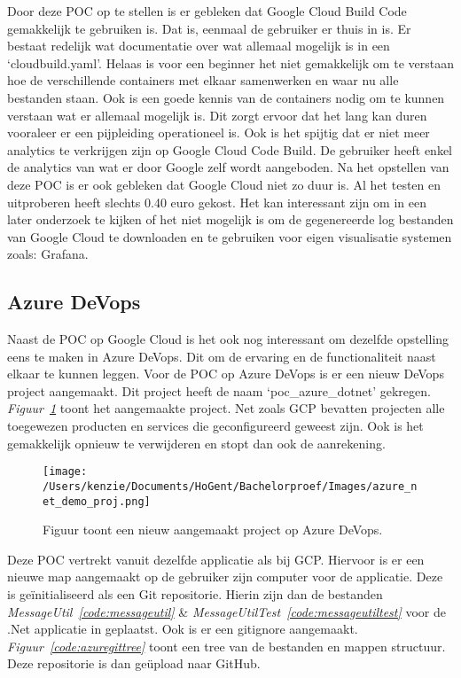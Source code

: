 Door deze POC op te stellen is er gebleken dat Google Cloud Build Code gemakkelijk te gebruiken is. Dat is, eenmaal de gebruiker er thuis in is. Er bestaat redelijk wat documentatie over wat allemaal mogelijk is in een ‘cloudbuild.yaml’. Helaas is voor een beginner het niet gemakkelijk om te verstaan hoe de verschillende containers met elkaar samenwerken en waar nu alle bestanden staan. Ook is een goede kennis van de containers nodig om te kunnen verstaan wat er allemaal mogelijk is. Dit zorgt ervoor dat het lang kan duren vooraleer er een pijpleiding operationeel is. Ook is het spijtig dat er niet meer analytics te verkrijgen zijn op Google Cloud Code Build. De gebruiker heeft enkel de analytics van wat er door Google zelf wordt aangeboden. Na het opstellen van deze POC is er ook gebleken dat Google Cloud niet zo duur is. Al het testen en uitproberen heeft slechts 0.40 euro gekost.
 Het kan interessant zijn om in een later onderzoek te kijken of het niet mogelijk is om de gegenereerde log bestanden van Google Cloud te downloaden en te gebruiken voor eigen visualisatie systemen zoals: Grafana. 

\subsection{Azure DeVops}
\label{sec:VergelijkingADV}
Naast de POC op Google Cloud is het ook nog interessant om dezelfde opstelling eens te maken in Azure DeVops. Dit om de ervaring en de functionaliteit naast elkaar te kunnen leggen. Voor de POC op Azure DeVops is er een nieuw DeVops project aangemaakt. Dit project heeft de naam ‘poc\_azure\_dotnet’ gekregen. \emph{Figuur~\ref{fig:Azure_POC_proj}} toont het aangemaakte project. Net zoals GCP bevatten projecten alle toegewezen producten en services die geconfigureerd geweest zijn. Ook is het gemakkelijk opnieuw te verwijderen en stopt dan ook de aanrekening.

\begin{figure}[!htbp]
    \centering
    \texttt{[image: /Users/kenzie/Documents/HoGent/Bachelorproef/Images/azure\_net\_demo\_proj.png]}
    \caption{Figuur toont een nieuw aangemaakt project op Azure DeVops.}
    \label{fig:Azure_POC_proj}
\end{figure}

Deze POC vertrekt vanuit dezelfde applicatie als bij GCP. Hiervoor is er een nieuwe map aangemaakt op de gebruiker zijn computer voor de applicatie. Deze is geïnitialiseerd als een Git repositorie. Hierin zijn dan de bestanden \emph{MessageUtil~\ref{code:messageutil}} \& \emph{MessageUtilTest~\ref{code:messageutiltest}} voor de .Net applicatie in geplaatst. Ook is er een gitignore aangemaakt. \emph{Figuur~\ref{code:azuregittree}} toont een tree van de bestanden en mappen structuur. Deze repositorie is dan geüpload naar GitHub.

